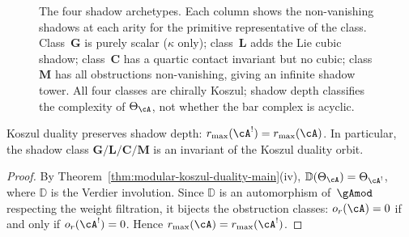 \begin{figure}[ht]
\caption{The four shadow archetypes.
Each column shows the non-vanishing shadows at each arity
for the primitive representative of the class.
Class~$\mathbf{G}$ is purely scalar ($\kappa$ only);
class~$\mathbf{L}$ adds the Lie cubic shadow;
class~$\mathbf{C}$ has a quartic contact invariant
but no cubic;
class~$\mathbf{M}$ has all obstructions non-vanishing,
giving an infinite shadow tower.
All four classes are chirally Koszul; shadow depth
classifies the complexity of $\Theta_\cA$,
not whether the bar complex is acyclic.}%
\label{fig:shadow-archetype-classification}
\end{figure}

\begin{corollary}
\label{cor:shadow-depth-koszul-invariance}
\ClaimStatusProvedHere
{}
Koszul duality preserves shadow depth:
$r_{\max}(\cA^!) = r_{\max}(\cA)$.  In particular, the shadow
class $\mathbf{G}/\mathbf{L}/\mathbf{C}/\mathbf{M}$ is an
invariant of the Koszul duality orbit.
\end{corollary}

\begin{proof}
By Theorem~\ref{thm:modular-koszul-duality-main}(iv),
$\mathbb{D}(\Theta_\cA) = \Theta_{\cA^!}$, where
$\mathbb{D}$ is the Verdier involution.  Since $\mathbb{D}$
is an automorphism of~$\gAmod$ respecting the weight
filtration, it bijects the obstruction classes:
$o_r(\cA) = 0$ if and only if $o_r(\cA^!) = 0$.
Hence $r_{\max}(\cA) = r_{\max}(\cA^!)$.
\end{proof}

